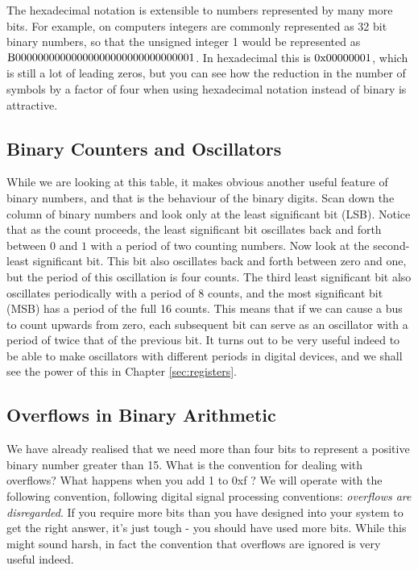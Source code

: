 \documentclass[../physical_computing.tex]{subfiles}
\begin{document}
The hexadecimal notation is extensible to numbers represented by many more bits. For example, on computers integers are commonly represented as 32 bit binary numbers, so that the unsigned integer 1 would be represented as $\rm B00000000000000000000000000000001$. In hexadecimal this is $\rm 0x00000001$, which is still a lot of leading zeros, but you can see how the reduction in the number of symbols by a factor of four when using hexadecimal notation instead of binary is attractive.

\subsection{Binary Counters and Oscillators}
\label{sec:oscillators}

While we are looking at this table, it makes obvious another useful feature of binary numbers, and that is the behaviour of the binary digits. Scan down the column of binary numbers and look only at the least significant bit (LSB). Notice that as the count proceeds, the least significant bit oscillates back and forth between $0$ and $1$ with a period of two counting numbers. Now look at the second-least significant bit. This bit also oscillates back and forth between zero and one, but the period of this oscillation is four counts. The third least significant bit also oscillates periodically with a period of 8 counts, and the most significant bit (MSB) has a period of the full 16 counts. This means that if we can cause a bus to count upwards from zero, each subsequent bit can serve as an oscillator with a period of twice that of the previous bit. It turns out to be very useful indeed to be able to make oscillators with different periods in digital devices, and we shall see the power of this in Chapter \ref{sec:registers}.

\subsection{Overflows in Binary Arithmetic}
\label{sec:overflows}

We have already realised that we need more than four bits to represent a positive binary number greater than 15. What is the convention for dealing with overflows? What happens when you add 1 to 0xf ? We will operate with the following convention, following digital signal processing conventions: {\it overflows are disregarded}. If you require more bits than you have designed into your system to get the right answer, it's just tough - you should have used more bits. While this might sound harsh, in fact the convention that overflows are ignored is very useful indeed.
\end{document}
